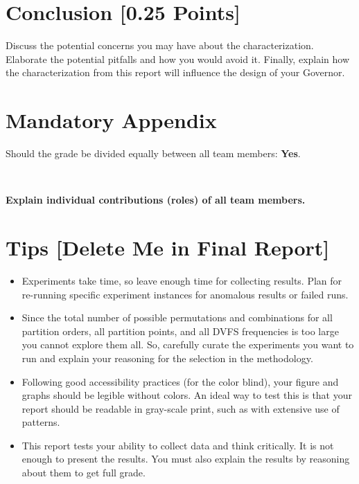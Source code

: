 \documentclass{uva-inf-article}
\begin{document}
\section{Conclusion [0.25 Points]} 

Discuss the potential concerns you may have about the characterization. Elaborate the potential pitfalls and how you would avoid it. Finally, explain how the characterization from this report will influence the design of your Governor.

\section{Mandatory Appendix}

Should the grade be divided equally between all team members: \textbf {Yes}. 

~

\noindent \textbf{Explain individual contributions (roles) of all team members.}


\section{Tips [Delete Me in Final Report]} 

\begin{itemize}

\item Experiments take time, so leave enough time for collecting results. Plan for re-running specific experiment instances for anomalous results or failed runs.

\item Since the total number of possible permutations and combinations for all partition orders, all partition points, and all DVFS frequencies is too large you cannot explore them all. So, carefully curate the experiments you want to run and explain your reasoning for the selection in the methodology.

\item Following good accessibility practices (for the color blind), your figure and graphs should be legible without colors. An ideal way to test this is that your report should be readable in gray-scale print, such as with extensive use of patterns.

\item This report tests your ability to collect data and think critically. It is not enough to present the results. You must also explain the results by reasoning about them to get full grade.

\end{itemize}
\end{document}
